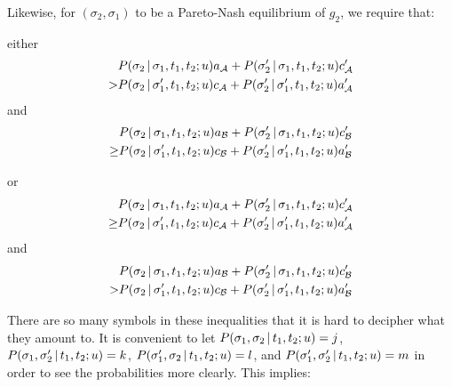 \noindent Likewise, for $(\sigma_2, \sigma_1)$ to be a Pareto-Nash equilibrium of $g_2$, we require that:

\noindent either
\begin{align*} 
        & P(\sigma_2 \,|\, \sigma_1, t_1, t_2; u)a_{\cal A} + P(\sigma'_2 \,|\, \sigma_1, t_1, t_2; u)c'_{\cal A}\\
        > & P(\sigma_2 \,|\, \sigma'_1, t_1, t_2; u)c_{\cal A} + P(\sigma'_2 \,|\, \sigma'_1, t_1, t_2; u)a'_{\cal A}
\end{align*}
and
\begin{align*}
        & P(\sigma_2 \,|\, \sigma_1, t_1, t_2; u)a_{\cal B} + P(\sigma'_2 \,|\, \sigma_1, t_1, t_2; u)c'_{\cal B}\\
        \geq & P(\sigma_2 \,|\, \sigma'_1, t_1, t_2; u)c_{\cal B} + P(\sigma'_2 \,|\, \sigma'_1, t_1, t_2; u)a'_{\cal B}
\end{align*}

\noindent or
\begin{align*}
         & P(\sigma_2 \,|\, \sigma_1, t_1, t_2; u)a_{\cal A} + P(\sigma'_2 \,|\, \sigma_1, t_1, t_2; u)c'_{\cal A}\\
    \geq & P(\sigma_2 \,|\, \sigma'_1, t_1, t_2; u)c_{\cal A} + P(\sigma'_2 \,|\, \sigma'_1, t_1, t_2; u)a'_{\cal A} 
\end{align*}
and
\begin{align*}
        & P(\sigma_2 \,|\, \sigma_1, t_1, t_2; u)a_{\cal B} + P(\sigma'_2 \,|\, \sigma_1, t_1, t_2; u)c'_{\cal B}\\
       > & P(\sigma_2 \,|\, \sigma'_1, t_1, t_2; u)c_{\cal B} + P(\sigma'_2 \,|\, \sigma'_1, t_1, t_2; u)a'_{\cal B}
\end{align*}

There are so many symbols in these inequalities that it is hard to decipher what they amount to. It is convenient to let $P(\sigma_1,\sigma_2 \,|\, t_1, t_2; u) = j$, $P(\sigma_1,\sigma'_2 \,|\, t_1, t_2; u) = k$, $P(\sigma'_1,\sigma_2 \,|\, t_1, t_2; u) = l$, and $P(\sigma'_1,\sigma'_2 \,|\, t_1, t_2; u) = m$ in order to see the probabilities more clearly. This implies:

